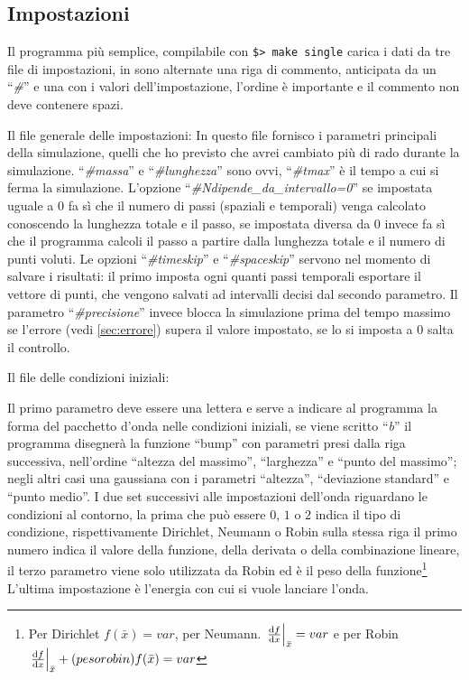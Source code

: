 \subsection{Impostazioni}
Il programma pi\`u semplice, compilabile con \lstinline|$> make single| carica i dati da tre file di impostazioni, in sono alternate una riga di commento, anticipata da un ``\textit{\#}'' e una con i valori dell'impostazione, l'ordine \`e importante e il commento non deve contenere spazi.

Il file generale delle impostazioni:
\label{lst:settings}
In questo file fornisco i parametri principali della simulazione, quelli che ho previsto che avrei cambiato pi\`u di rado durante la simulazione. ``\textit{\#massa}'' e ``\textit{\#lunghezza}'' sono ovvi, ``\textit{\#tmax}'' \`e il tempo a cui si ferma la simulazione. L'opzione ``\textit{\#Ndipende\_da\_intervallo=0}'' se impostata uguale a $0$ fa s\`i che il numero di passi (spaziali e temporali) venga calcolato conoscendo la lunghezza totale e il passo, se impostata diversa da $0$ invece fa s\`i che il programma calcoli il passo a partire dalla lunghezza totale e il numero di punti voluti. Le opzioni ``\textit{\#timeskip}'' e ``\textit{\#spaceskip}'' servono nel momento di salvare i risultati: il primo imposta ogni quanti passi temporali esportare il vettore di punti, che vengono salvati ad intervalli decisi dal secondo parametro. Il parametro ``\textit{\#precisione}'' invece blocca la simulazione prima del tempo massimo se l'errore (vedi \autoref{sec:errore}) supera il valore impostato, se lo si imposta a 0 salta il controllo.

Il file delle condizioni iniziali:

Il primo parametro deve essere una lettera e serve a indicare al programma la forma del pacchetto d'onda nelle condizioni iniziali, se viene scritto ``\textit{b}'' il programma disegner\`a la funzione ``bump'' con parametri presi dalla riga successiva, nell'ordine ``altezza del massimo'', ``larghezza'' e ``punto del massimo''; negli altri casi una gaussiana con i parametri ``altezza'', ``deviazione standard'' e ``punto medio''. I due set successivi alle impostazioni dell'onda riguardano le condizioni al contorno, la prima che pu\`o essere $0$, $1$ o $2$ indica il tipo di condizione, rispettivamente Dirichlet, Neumann o Robin sulla stessa riga il primo numero indica il valore della funzione, della derivata o della combinazione lineare, il terzo parametro viene solo utilizzata da Robin ed \`e il peso della funzione\footnote{Per Dirichlet $f(\bar x) = var$, per Neumann. $\lr.|{\de{f}x}_{\bar x} = var$ e per Robin $\lr.|{\de{f}x}_{\bar x} + (pesorobin) f(\bar x) = var$}
L'ultima impostazione \`e l'energia con cui si vuole lanciare l'onda.

